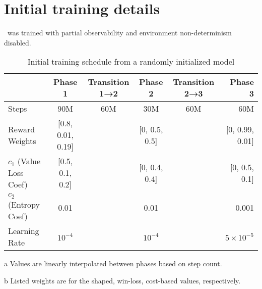 \documentclass[conference]{IEEEtran}
\newcounter{supptable}
\newenvironment{supptable}
  {\renewcommand{\tablename}{Supplemental Table}\setcounter{table}{\value{supptable}}\addtocounter{supptable}{1}\begin{table}}
  {\end{table}\setcounter{supptable}{\value{table}}}
\begin{document}
\section{Initial training details}
\label{appendix:initial-training-details}
\agentName\ was trained with partial observability and environment non-determinism disabled.

\begin{supptable}[H]
    \centering
    \begin{threeparttable}
    \caption{Initial training schedule from a randomly initialized model}
    \label{tab:initial-training-schedule}
    \begin{tabular}{lccccr}
    \toprule
     & Phase 1 & Transition 1→2\tnote{a} & Phase 2 & Transition 2→3\tnote{a} & Phase 3 \\
    \midrule
    Steps & 90M & 60M & 30M & 60M & 60M \\
    Reward Weights\tnote{b} & [0.8, 0.01, 0.19] &  & [0, 0.5, 0.5] &  & [0, 0.99, 0.01] \\
    $c_1$ (Value Loss Coef)\tnote{b} & [0.5, 0.1, 0.2] &  & [0, 0.4, 0.4] &  & [0, 0.5, 0.1]\\
    $c_2$ (Entropy Coef)& 0.01 & & 0.01 & & 0.001 \\
    Learning Rate & $10^{-4}$ & & $10^{-4}$ & & $5 \times 10^{-5}$\\
    \bottomrule
    \end{tabular}
    \begin{tablenotes}
       \item[a] Values are linearly interpolated between phases based on step count.
       \item[b] Listed weights are for the shaped, win-loss, cost-based values, respectively.
    \end{tablenotes}
    \end{threeparttable}
\end{supptable}
\end{document}
